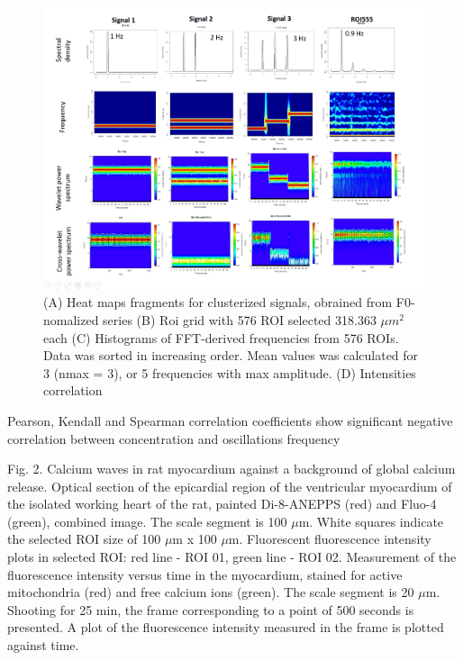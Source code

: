 \documentclass{biophys-new}
\begin{document}
\begin{figure}
    \includegraphics[width=0.9\linewidth]{fig7.png}
    \caption{(A) Heat maps fragments for clusterized signals, obrained from F0-nomalized series (B) Roi grid with 576 ROI selected 318.363 $\mu m^2$ each (C) Histograms of FFT-derived frequencies from 576 ROIs. Data was sorted in increasing order. Mean values was calculated for 3 (nmax = 3), or 5 frequencies with max amplitude. (D) Intensities correlation}
    \label{fig:fig7}
\end{figure}


Pearson, Kendall and Spearman correlation coefficients show significant negative correlation between  concentration and  oscillations frequency


Fig. 2.  Calcium waves in rat myocardium against a background of global calcium release.
Optical section of the epicardial region of the ventricular myocardium of the isolated working heart of the rat, painted Di-8-ANEPPS (red) and Fluo-4 (green), combined image.
The scale segment is 100 $\mu$m.
White squares indicate the selected ROI size of 100 $\mu$m x 100 $\mu$m.
Fluorescent fluorescence intensity plots in selected ROI: red line - ROI 01, green line - ROI 02.
Measurement of the fluorescence intensity versus time in the myocardium, stained for active mitochondria (red) and free calcium ions (green).
The scale segment is 20 $\mu$m. Shooting for 25 min, the frame corresponding to a point of 500 seconds is presented.
A plot of the fluorescence intensity measured in the frame is plotted against time.
\end{document}
